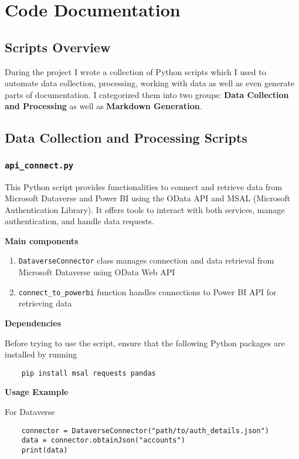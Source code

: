 \section{Code Documentation}
\label{sec:CodeDocumentation}

\subsection{Scripts Overview}

During the project I wrote a collection of Python scripts which I used to automate data collection, processing, working with data as well as even generate parts of documentation. I categorized them into two groups: \textbf{Data Collection and Processing} as well as \textbf{Markdown Generation}.

\subsection{Data Collection and Processing Scripts}

\subsubsection{\texttt{api\_connect.py}}

This Python script provides functionalities to connect and retrieve data from
Microsoft Dataverse and Power BI using the OData API and MSAL (Microsoft
Authentication Library). It offers tools to interact with both
services, manage authentication, and handle data requests.

\textbf{Main components}
\begin{enumerate}
	\item \texttt{DataverseConnector} class manages connection and data retrieval from Microsoft Dataverse using OData Web API
	\item \texttt{connect\_to\_powerbi} function handles connections to Power BI API for retrieving data
\end{enumerate}

\textbf{Dependencies}

Before trying to use the script, ensure that the following Python packages are installed by running
\begin{verbatim}
	pip install msal requests pandas
\end{verbatim}

\textbf{Usage Example}

For Dataverse
\begin{verbatim}
	connector = DataverseConnector("path/to/auth_details.json")
	data = connector.obtainJson("accounts")
	print(data)
\end{verbatim}

